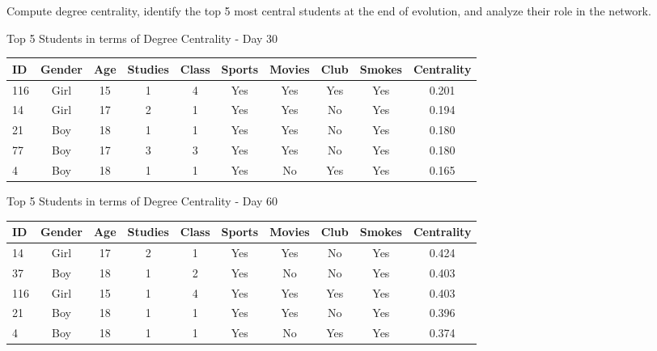 \begin{question}
\begin{subquestion}{Compute degree centrality, identify the top 5 most central students at the end of evolution,
			and analyze their role in the network.}
{			%
			\begin{center}								
				Top 5 Students in terms of Degree Centrality - Day 30
				\begin{tabular}{lccccccccc}
					\hline
					ID & Gender & Age & Studies & Class & Sports & Movies & Club & Smokes & Centrality \\
					\hline
					116 & Girl & 15 & 1 & 4 & Yes & Yes & Yes & Yes & 0.201 \\
					14 & Girl & 17 & 2 & 1 & Yes & Yes & No & Yes & 0.194 \\
					21 & Boy & 18 & 1 & 1 & Yes & Yes & No & Yes & 0.180 \\
					77 & Boy & 17 & 3 & 3 & Yes & Yes & No & Yes & 0.180 \\
					4 & Boy & 18 & 1 & 1 & Yes & No & Yes & Yes & 0.165 \\
					\hline
				\end{tabular}
				\label{table:d30}
			\end{center}
			
			\begin{center}
				Top 5 Students in terms of Degree Centrality - Day 60
				\begin{tabular}{lccccccccc}				
					\hline
					ID & Gender & Age & Studies & Class & Sports & Movies & Club & Smokes & Centrality \\
					\hline
					14 & Girl & 17 & 2 & 1 & Yes & Yes & No & Yes & 0.424 \\
					37 & Boy & 18 & 1 & 2 & Yes & No & No & Yes & 0.403 \\
					116 & Girl & 15 & 1 & 4 & Yes & Yes & Yes & Yes & 0.403 \\
					21 & Boy & 18 & 1 & 1 & Yes & Yes & No & Yes & 0.396 \\
					4 & Boy & 18 & 1 & 1 & Yes & No & Yes & Yes & 0.374 \\
					\hline
				\end{tabular}
					\label{table:d60}
			\end{center}
			
}
\end{subquestion}
\end{question}
